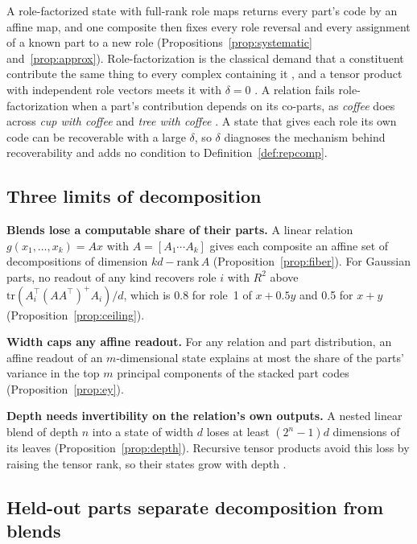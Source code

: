 A role-factorized state with full-rank role maps returns every part's code by an affine map, and one composite then fixes every role reversal and every assignment of a known part to a new role (Propositions~\ref{prop:systematic} and~\ref{prop:approx}). Role-factorization is the classical demand that a constituent contribute the same thing to every complex containing it \citep{fodor1988}, and a tensor product with independent role vectors meets it with $\delta = 0$ \citep{smolensky1990}. A relation fails role-factorization when a part's contribution depends on its co-parts, as \emph{coffee} does across \emph{cup with coffee} and \emph{tree with coffee} \citep{smolensky1988}. A state that gives each role its own code can be recoverable with a large $\delta$, so $\delta$ diagnoses the mechanism behind recoverability and adds no condition to Definition~\ref{def:repcomp}.

\subsection{Three limits of decomposition}
\label{sec:consequences}

\textbf{Blends lose a computable share of their parts.} A linear relation $g(x_1, \ldots, x_k) = A x$ with $A = [A_1 \cdots A_k]$ gives each composite an affine set of decompositions of dimension $kd - \mathrm{rank}\,A$ (Proposition~\ref{prop:fiber}). For Gaussian parts, no readout of any kind recovers role $i$ with $R^2$ above $\mathrm{tr}(A_i^{\top}(AA^{\top})^{+}A_i)/d$, which is 0.8 for role~1 of $x + 0.5y$ and 0.5 for $x + y$ (Proposition~\ref{prop:ceiling}).

\textbf{Width caps any affine readout.} For any relation and part distribution, an affine readout of an $m$-dimensional state explains at most the share of the parts' variance in the top $m$ principal components of the stacked part codes (Proposition~\ref{prop:ey}).

\textbf{Depth needs invertibility on the relation's own outputs.} A nested linear blend of depth $n$ into a state of width $d$ loses at least $(2^n - 1)d$ dimensions of its leaves (Proposition~\ref{prop:depth}). Recursive tensor products avoid this loss by raising the tensor rank, so their states grow with depth \citep{smolensky1990}.

\subsection{Held-out parts separate decomposition from blends}
\label{sec:calibration}

